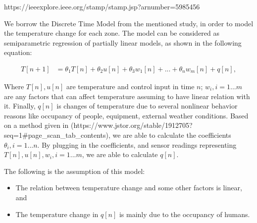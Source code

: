 \documentclass[11pt]{article}
\providecommand{\tightlist}{%
      \setlength{\itemsep}{0pt}\setlength{\parskip}{0pt}}
\begin{document}
https://ieeexplore.ieee.org/stamp/stamp.jsp?arnumber=5985456

We borrow the Discrete Time Model from the mentioned study, in order to
model the temperature change for each zone. The model can be considered
as semiparametric regression of partially linear models, as shown in the
following equation:

\begin{align}
T[n+1] & =  \theta_1 T[n] + \theta_2 u[n] + \theta_3 w_1[n] + ... +\theta_n w_m[n] + q[n],
\end{align}

Where \(T[n], u[n]\) are temperature and control input in time \(n\);
\(w_i, i=1...m\) are any factors that can affect temperature assuming to
have linear relation with it. Finally, \(q[n]\) is changes of
temperature due to several nonlinear behavior reasons like occupancy of
people, equipment, external weather conditions. Based on a method given
in
(https://www.jstor.org/stable/1912705?seq=1\#page\_scan\_tab\_contents),
we are able to calculate the coefficients \(\theta_i, i=1...n\). By
plugging in the coefficients, and sensor readings representing
\(T[n], u[n], w_i, i=1...m\), we are able to calculate \(q[n]\).

The following is the assumption of this model:

\begin{itemize}
\tightlist
\item
  The relation between temperature change and some other factors is
  linear, and
\item
  The temperature change in \(q[n]\) is mainly due to the occupancy of
  humans.
\end{itemize}
\end{document}
